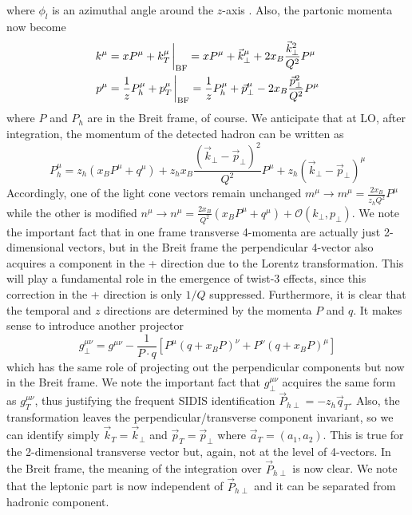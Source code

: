 where $\phi_l$ is an azimuthal angle around the $z$-axis \cite{kanazawa_contribution_2013}.
Also, the partonic momenta now become
\begin{equation}\label{eq:partonic momenta in BF}
    \begin{aligned}
        k^\mu&=xP^\mu+k_T^\mu\eval_{\text{BF}}=x P^\mu+\vec k_\perp^\mu+2x_B\frac{\vec k_\perp^2}{Q^2}P^\mu\\
        p^\mu&=\frac{1}{z}P_h^\mu+p_T^\mu\eval_{\text{BF}}=\frac{1}{z}P_h^\mu+\vec p_\perp^\mu-2x_B\frac{\vec p_\perp^2}{Q^2}P^\mu
    \end{aligned}
\end{equation}
where $P$ and $P_h$ are in the Breit frame, of course. We anticipate that at LO, after integration, the momentum of the detected hadron can be written as
\begin{equation}
    P_h^\mu= z_h(x_BP^\mu+q^\mu)+z_hx_B\frac{(\vec k_\perp - \vec p_\perp)^2}{Q^2}P^\mu+z_h(\vec k_\perp-\vec p_\perp)^\mu
\end{equation}
Accordingly, one of the light cone vectors remain unchanged $m ^\mu\to m^\mu=\frac{2x_B}{z_hQ^2}P^\mu$ while the other is modified $n^\mu\to n^\mu=\frac{2x_B}{Q^2}(x_BP^\mu+q^\mu)+\mathcal{O}(k_\perp,p_\perp)$. We note the important fact that in one frame transverse 4-momenta are actually just 2-dimensional vectors, but in the Breit frame the perpendicular 4-vector also acquires a component in the + direction due to the Lorentz transformation. This will play a fundamental role in the emergence of twist-3 effects, since this correction in the + direction is only $1/Q$ suppressed. Furthermore, it is clear that the temporal and $z$ directions are determined by the momenta $P$ and $q$. It makes sense to introduce another projector 
\begin{equation}
    g_\perp^{\mu\nu}=g^{\mu\nu}-\frac{1}{P\cdot q}[P^\mu(q+x_BP)^\nu + P^\nu(q+x_BP)^\mu]
\end{equation}
which has the same role of projecting out the perpendicular components but now in the Breit frame. We note the important fact that $g_\perp^{\mu\nu}$ acquires the same form as $g_T^{\mu\nu}$, thus justifying the frequent SIDIS identification $\vec P_{h\perp}=-z_h\vec q_T$. Also, the transformation leaves the perpendicular/transverse component invariant, so we can identify simply $\vec k_T=\vec k_\perp$ and $\vec p_T =\vec p_\perp$ where $\vec a_T=(a_1,a_2)$. This is true for the 2-dimensional transverse vector but, again, not at the level of 4-vectors. In the Breit frame, the meaning of the integration over $\vec P_{h\perp}$ is now clear. We note that the leptonic part is now independent of $\vec P_{h\perp}$ and it can be separated from hadronic component.

